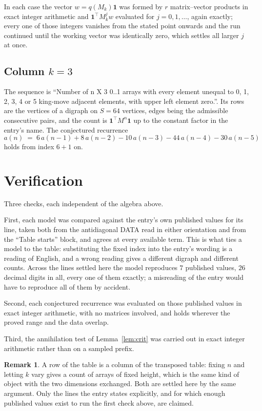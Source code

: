 \documentclass[11pt,a4paper]{article}
\theoremstyle{plain}
\theoremstyle{definition}
\newtheorem{remark}[theorem]{Remark}
\begin{document}
In each case the vector $w=q(M_k)\mathbf{1}$ was formed by $r$ matrix--vector products in
exact integer arithmetic and $\mathbf{1}^{\!\top}M_k^{j}w$ evaluated for $j=0,1,\dots$,
again exactly; every one of those integers vanishes from the stated point onwards and the run
continued until the working vector was identically zero, which settles all larger $j$ at once.

\subsection*{Column $k$$=3$}
The sequence is ``Number of n X 3 0..1 arrays with every element unequal to 0, 1, 2, 3, 4 or 5 king-move adjacent elements, with upper left element zero.''. Its rows are the vertices of a digraph on
$S=64$ vertices, edges being the admissible consecutive pairs, and the count is
$\mathbf{1}^{\!\top}M^{n}\mathbf{1}$ up to the constant factor in the entry's name.
The conjectured recurrence
\[
a(n)\;=\;6\,a(n-1) + 8\,a(n-2) - 10\,a(n-3) - 44\,a(n-4) - 30\,a(n-5)
\]
holds from index $6+1$ on.

\section{Verification}

Three checks, each independent of the algebra above.

First, each model was compared against the entry's own published values for its line, taken
both from the antidiagonal DATA read in either orientation and from the ``Table starts''
block, and agrees at every available term. This is what ties a model to the table:
substituting the fixed index into the entry's wording is a reading of English, and a wrong
reading gives a different digraph and different counts. Across the lines settled here the
model reproduces $7$ published values, $26$ decimal digits in all, every one of
them exactly; a misreading of the entry would have to reproduce all of them by accident.

Second, each conjectured recurrence was evaluated on those published values in exact
integer arithmetic, with no matrices involved, and holds wherever the proved range and the
data overlap.

Third, the annihilation test of Lemma~\ref{lem:crit} was carried out in exact integer
arithmetic rather than on a sampled prefix.

\begin{remark}
A row of the table is a column of the transposed table: fixing $n$ and letting $k$ vary gives a
count of arrays of fixed height, which is the same kind of object with the two dimensions
exchanged. Both are settled here by the same argument. Only the lines the entry states
explicitly, and for which enough published values exist to run the first check above, are
claimed.
\end{remark}
\end{document}
